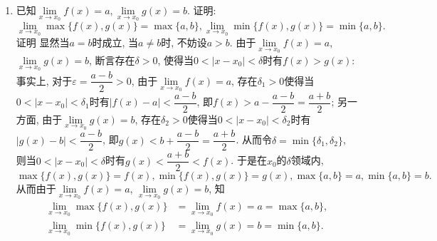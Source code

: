 \documentclass[UTF8,a4paper,20pt]{article}
\begin{document}
\begin{enumerate}[1.]
\item 已知$\lim\limits_{x\to x_0}f(x)=a, \lim\limits_{x\to x_0}g(x)=b$. 证明: 
\[\lim\limits_{x\to x_0}\max\{f(x), g(x)\}=\max\{a,b\}, \lim\limits_{x\to x_0}\min\{f(x),g(x)\}=\min\{a,b\}.\]
{\heiti 证明}
显然当$a=b$时成立, 当$a\neq b$时, 不妨设$a>b$. 由于$\lim\limits_{x\to x_0}f(x)=a$, $\lim\limits_{x\to x_0}g(x)=b$, 断言存在$\delta>0$, 使得当$0<|x-x_0|<\delta$时有$f(x)>g(x)$: 事实上, 对于$\varepsilon=\dfrac{a-b}{2}>0$, 由于$\lim\limits_{x\to x_0}f(x)=a$, 存在$\delta_1>0$使得当$0<|x-x_0|<\delta_1$时有$|f(x)-a|<\dfrac{a-b}{2}$, 即$f(x)>a-\dfrac{a-b}{2}=\dfrac{a+b}{2}$; 另一方面, 由于$\lim\limits_{x\to x_0}g(x)=b$, 存在$\delta_2>0$使得当$0<|x-x_0|<\delta_2$时有$|g(x)-b|<\dfrac{a-b}{2}$, 即$g(x)<b+\dfrac{a-b}{2}=\dfrac{a+b}{2}$. 从而令$\delta=\min\{\delta_1,\delta_2\}$, 则当$0<|x-x_0|<\delta$时有$g(x)<\dfrac{a+b}{2}<f(x)$. 于是在$x_0$的$\delta$领域内, 
\[\max\{f(x),g(x)\}=f(x), \min\{f(x),g(x)\}=g(x), \max\{a,b\}=a, \min\{a,b\}=b. \]
从而由于$\lim\limits_{x\to x_0}f(x)=a$, $\lim\limits_{x\to x_0}g(x)=b$, 知
\begin{equation*}
\begin{split}
\lim\limits_{x\to x_0}\max\{f(x), g(x)\}&=\lim\limits_{x\to x_0} f(x)=a=\max\{a,b\},\\ 
\lim\limits_{x\to x_0}\min\{f(x),g(x)\}&=\lim\limits_{x\to x_0} g(x)=b=\min\{a,b\}.
\end{split}
\end{equation*}

\end{enumerate}

\clearpage
\end{document}
